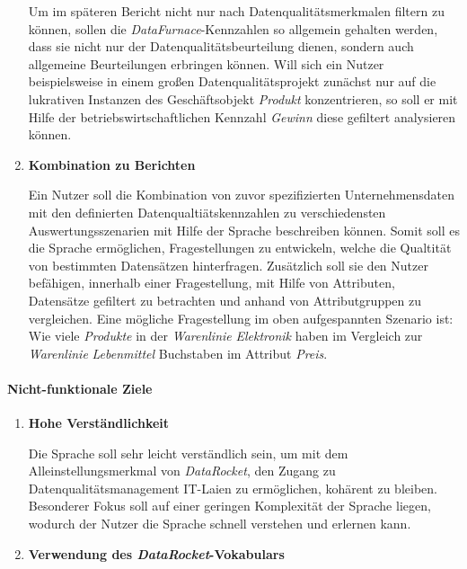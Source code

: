 \documentclass[
  language=german, %
  type=bachelor,%
  ngerman
]{isthesis}
\begin{document}
\begin{content}
\begin{enumerate}
        Um im späteren Bericht nicht nur nach Datenqualitätsmerkmalen filtern
        zu können, sollen die \textit{DataFurnace}-Kennzahlen so allgemein
        gehalten werden, dass sie nicht nur der Datenqualitätsbeurteilung
        dienen, sondern auch allgemeine Beurteilungen erbringen können. Will
        sich ein Nutzer beispielsweise in einem großen Datenqualitätsprojekt
        zunächst nur auf die lukrativen Instanzen des Geschäftsobjekt
        \textit{Produkt} konzentrieren, so soll er mit Hilfe der
        betriebswirtschaftlichen Kennzahl \textit{Gewinn} diese gefiltert
        analysieren können.
        
      \item \textbf{Kombination zu Berichten}

        Ein Nutzer soll die Kombination von zuvor spezifizierten
        Unternehmensdaten mit den definierten Datenqualtiätskennzahlen zu
        verschiedensten Auswertungsszenarien mit Hilfe der Sprache beschreiben
        können. Somit soll es die Sprache ermöglichen, Fragestellungen zu
        entwickeln, welche die Qualtität von bestimmten Datensätzen hinterfragen.
        Zusätzlich soll sie den Nutzer befähigen, innerhalb einer
        Fragestellung, mit Hilfe von Attributen, Datensätze gefiltert zu
        betrachten und anhand von Attributgruppen zu vergleichen. Eine mögliche
        Fragestellung im oben aufgespannten Szenario ist: Wie viele
        \textit{Produkte} in der \textit{Warenlinie} \textit{Elektronik} haben
        im Vergleich zur \textit{Warenlinie} \textit{Lebenmittel} Buchstaben im
        Attribut \textit{Preis}.
    \end{enumerate}

  \paragraph{Nicht-funktionale Ziele}
    \begin{enumerate}
      \item \textbf{Hohe Verständlichkeit}

				Die Sprache soll sehr leicht verständlich sein, um mit dem
				Alleinstellungsmerkmal von \textit{DataRocket}, den Zugang zu
				Datenqualitätsmanagement IT-Laien zu ermöglichen, kohärent zu bleiben.
				Besonderer Fokus soll auf einer geringen Komplexität der Sprache
				liegen, wodurch der Nutzer die Sprache schnell verstehen und erlernen
				kann.

      \item \textbf{Verwendung des \textit{DataRocket}-Vokabulars}


\end{enumerate}
\end{content}
\end{document}
